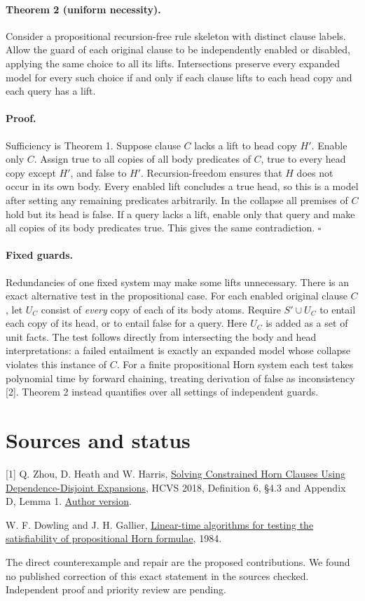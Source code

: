 \documentclass[11pt]{article}
\begin{document}
\paragraph{Theorem 2 (uniform necessity).} Consider a propositional recursion-free rule skeleton with distinct clause labels. Allow the guard of each original clause to be independently enabled or disabled, applying the same choice to all its lifts. Intersections preserve every expanded model for every such choice if and only if each clause lifts to each head copy and each query has a lift.

\paragraph{Proof.} Sufficiency is Theorem 1. Suppose clause $C$ lacks a lift to head copy $H'$. Enable only $C$. Assign true to all copies of all body predicates of $C$, true to every head copy except $H'$, and false to $H'$. Recursion-freedom ensures that $H$ does not occur in its own body. Every enabled lift concludes a true head, so this is a model after setting any remaining predicates arbitrarily. In the collapse all premises of $C$ hold but its head is false. If a query lacks a lift, enable only that query and make all copies of its body predicates true. This gives the same contradiction. \hfill$\square$

\paragraph{Fixed guards.} Redundancies of one fixed system may make some lifts unnecessary. There is an exact alternative test in the propositional case. For each enabled original clause $C$, let $U_C$ consist of \emph{every} copy of each of its body atoms. Require $S'\cup U_C$ to entail each copy of its head, or to entail false for a query. Here $U_C$ is added as a set of unit facts. The test follows directly from intersecting the body and head interpretations: a failed entailment is exactly an expanded model whose collapse violates this instance of $C$. For a finite propositional Horn system each test takes polynomial time by forward chaining, treating derivation of false as inconsistency [2]. Theorem 2 instead quantifies over all settings of independent guards.

\section*{Sources and status}
[1] Q. Zhou, D. Heath and W. Harris, \href{https://doi.org/10.4204/EPTCS.278.3}{Solving Constrained Horn Clauses Using Dependence-Disjoint Expansions}, HCVS 2018, Definition 6, \S4.3 and Appendix D, Lemma 1. \href{https://arxiv.org/abs/1705.03167}{Author version}.\par
[2] W. F. Dowling and J. H. Gallier, \href{https://doi.org/10.1016/0743-1066(84)90014-1}{Linear-time algorithms for testing the satisfiability of propositional Horn formulae}, 1984.
\par\medskip
The direct counterexample and repair are the proposed contributions. We found no published correction of this exact statement in the sources checked. Independent proof and priority review are pending.
\end{document}

